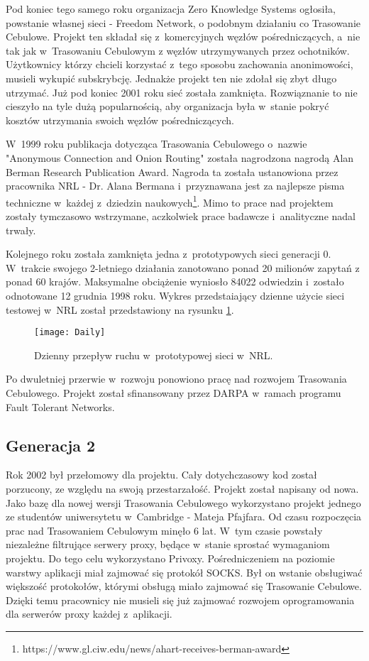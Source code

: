 Pod koniec tego samego roku organizacja Zero Knowledge Systems ogłosiła, powstanie własnej sieci - Freedom Network, o podobnym działaniu co Trasowanie Cebulowe. Projekt ten składał się z~komercyjnych węzłów pośredniczących, a~nie tak jak w~Trasowaniu Cebulowym z węzłów utrzymywanych przez ochotników. Użytkownicy którzy chcieli korzystać z~tego sposobu zachowania anonimowości, musieli wykupić subskrybcję. Jednakże projekt ten nie zdołał się zbyt długo utrzymać. Już pod koniec 2001 roku sieć została zamknięta. Rozwiąznanie to nie cieszyło na tyle dużą popularnością, aby organizacja była w~stanie pokryć kosztów utrzymania swoich węzłów pośredniczących.

W~1999 roku publikacja dotycząca Trasowania Cebulowego o~nazwie "Anonymous Connection and Onion Routing" została nagrodzona nagrodą Alan Berman Research Publication Award. Nagroda ta została ustanowiona przez pracownika NRL - Dr. Alana Bermana i~przyznawana jest za najlepsze pisma techniczne w~każdej z~dziedzin naukowych\footnote{https://www.gl.ciw.edu/news/ahart-receives-berman-award}. Mimo to prace nad projektem zostały tymczasowo wstrzymane, aczkolwiek prace badawcze i~analityczne nadal trwały.

Kolejnego roku została zamknięta jedna z~prototypowych sieci generacji 0. W~trakcie swojego 2-letniego działania zanotowano ponad 20 milionów zapytań z ponad 60 krajów. Maksymalne obciążenie wyniosło 84022 odwiedzin i~zostało odnotowane 12 grudnia 1998 roku. Wykres przedstaiający dzienne użycie sieci testowej w~NRL został przedstawiony na rysunku \ref{rys:dzienny}.

\begin{figure}
  \centering
  \texttt{[image: Daily]} 
  \caption[Caption for LOF]{Dzienny przepływ ruchu w~prototypowej sieci w~NRL\footnotemark.}
  \label{rys:dzienny}
\end{figure}

Po dwuletniej przerwie w~rozwoju ponowiono pracę nad rozwojem Trasowania Cebulowego. Projekt został sfinansowany przez DARPA w~ramach programu Fault Tolerant Networks.

\subsection{Generacja 2}
Rok 2002 był przełomowy dla projektu. Cały dotychczasowy kod został porzucony, ze względu na swoją przestarzałość. Projekt został napisany od nowa. Jako bazę dla nowej wersji Trasowania Cebulowego wykorzystano projekt jednego ze studentów uniwersytetu w~Cambridge - Mateja Pfajfara. Od czasu rozpoczęcia prac nad Trasowaniem Cebulowym minęło 6 lat. W~tym czasie powstały niezależne filtrujące serwery proxy, będące w~stanie sprostać wymaganiom projektu. Do tego celu wykorzystano Privoxy. Pośredniczeniem na poziomie warstwy aplikacji miał zajmować się protokół SOCKS. Był on wstanie obsługiwać większość protokołów, którymi obsługą miało zajmować się Trasowanie Cebulowe. Dzięki temu pracownicy nie musieli się już zajmować rozwojem oprogramowania dla serwerów proxy każdej z~aplikacji. 

